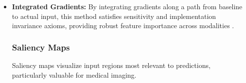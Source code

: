 \documentclass[pdflatex,sn-mathphys-num]{sn-jnl}%
\theoremstyle{thmstyleone}%
\theoremstyle{thmstyletwo}%
\theoremstyle{thmstylethree}%
\begin{document}
\begin{itemize}
    \item \textbf{Integrated Gradients:} By integrating gradients along a path from baseline to actual input, this method satisfies sensitivity and implementation invariance axioms, providing robust feature importance across modalities \cite{sundararajan2017axiomaticattributiondeepnetworks}. 

\subsubsection{Saliency Maps}

Saliency maps visualize input regions most relevant to predictions, particularly valuable for medical imaging.


\end{itemize}
\end{document}
